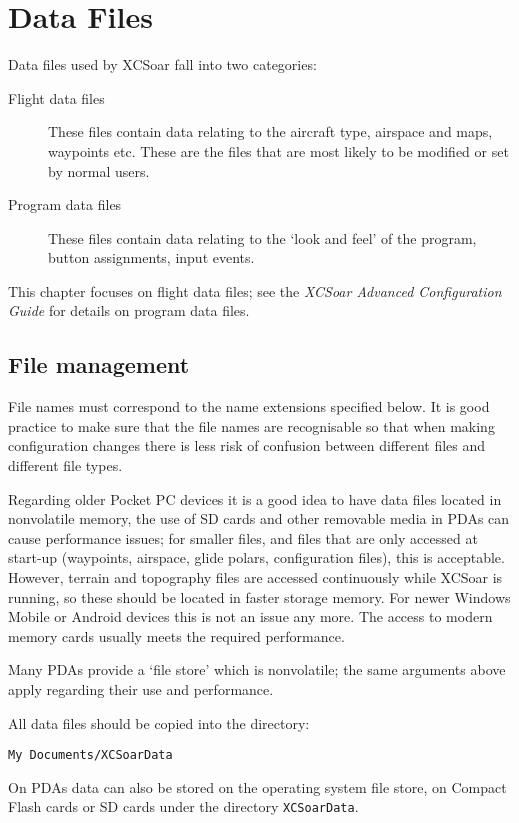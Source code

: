 \chapter{Data Files}\label{cha:data-files}

Data files used by XCSoar fall into two categories:
\begin{description}
\item[Flight data files]  These files contain data relating to
the aircraft type, airspace and maps, waypoints etc.  These are the
files that are most likely to be modified or set by normal users.
\item[Program data files]  These files contain data relating to
the `look and feel' of the program,
button assignments, input events.
\end{description}
This chapter focuses on flight data files; see the {\em XCSoar
Advanced Configuration Guide} for details on program data files.

\section{File management}

File names must correspond to the name extensions specified below.  It
is good practice to make sure that the file names are recognisable so
that when making configuration changes there is less risk of confusion
between different files and different file types.

Regarding older Pocket PC devices it is a good idea to have data files located in
nonvolatile memory, the use of SD cards and other removable media in
PDAs can cause performance issues; for smaller files, and files that
are only accessed at start-up (waypoints, airspace, glide polars,
configuration files), this is acceptable.  However, terrain and
topography files are accessed continuously while XCSoar is running, so
these should be located in faster storage memory.
For newer Windows Mobile or Android devices this is not an issue any 
more. The access to modern memory cards usually meets the required performance.   

Many PDAs provide a `file store' which is nonvolatile; the same
arguments above apply regarding their use and performance.

All data files should be copied into the directory: 
\begin{verbatim}
My Documents/XCSoarData
\end{verbatim}

On PDAs data can also be stored on the operating system file
store, on Compact Flash cards or SD cards under the directory
\verb|XCSoarData|.

